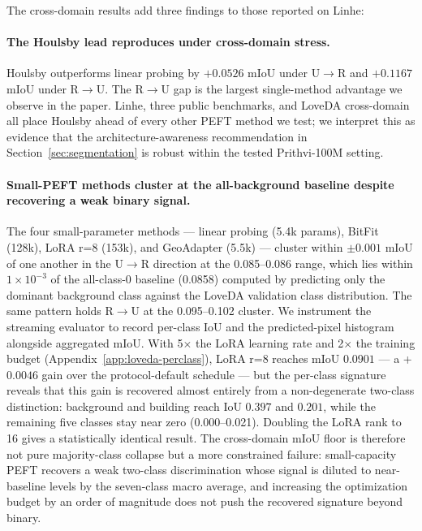 The cross-domain results add three findings to those reported on Linhe:

\paragraph{The Houlsby lead reproduces under cross-domain stress.} Houlsby outperforms linear probing by $+0.0526$ mIoU under U$\rightarrow$R and $+0.1167$ mIoU under R$\rightarrow$U. The R$\rightarrow$U gap is the largest single-method advantage we observe in the paper. Linhe, three public benchmarks, and LoveDA cross-domain all place Houlsby ahead of every other PEFT method we test; we interpret this as evidence that the architecture-awareness recommendation in Section~\ref{sec:segmentation} is robust within the tested Prithvi-100M setting.

\paragraph{Small-PEFT methods cluster at the all-background baseline despite recovering a weak binary signal.} The four small-parameter methods --- linear probing (5.4k params), BitFit (128k), LoRA r=8 (153k), and GeoAdapter (5.5k) --- cluster within $\pm 0.001$ mIoU of one another in the U$\rightarrow$R direction at the 0.085--0.086 range, which lies within $1 \times 10^{-3}$ of the all-class-0 baseline (0.0858) computed by predicting only the dominant background class against the LoveDA validation class distribution. The same pattern holds R$\rightarrow$U at the 0.095--0.102 cluster. We instrument the streaming evaluator to record per-class IoU and the predicted-pixel histogram alongside aggregated mIoU. With 5$\times$ the LoRA learning rate and 2$\times$ the training budget (Appendix~\ref{app:loveda-perclass}), LoRA r=8 reaches mIoU $0.0901$ --- a +$0.0046$ gain over the protocol-default schedule --- but the per-class signature reveals that this gain is recovered almost entirely from a non-degenerate two-class distinction: background and building reach IoU $0.397$ and $0.201$, while the remaining five classes stay near zero (0.000--0.021). Doubling the LoRA rank to 16 gives a statistically identical result. The cross-domain mIoU floor is therefore not pure majority-class collapse but a more constrained failure: small-capacity PEFT recovers a weak two-class discrimination whose signal is diluted to near-baseline levels by the seven-class macro average, and increasing the optimization budget by an order of magnitude does not push the recovered signature beyond binary.

